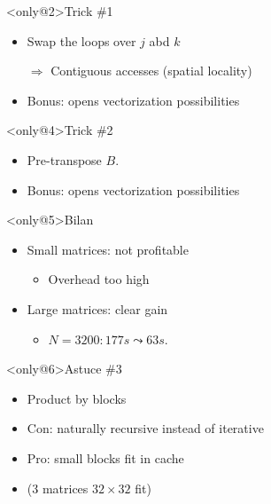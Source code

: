 \documentclass[xcolor={x11names,svgnames}]{beamer}
\begin{document}
\begin{frame}[label=applications,fragile]
\begin{overlayarea}{\textwidth}{4cm}
\begin{block}<only@2>{Trick \#1}
\begin{itemize}
\item Swap the loops over $j$ abd $k$
\item[$\Rightarrow$] Contiguous accesses (spatial locality)
\item Bonus: opens vectorization possibilities
\end{itemize}
\end{block}


\begin{block}<only@4>{Trick \#2}
\begin{itemize}
\item Pre-transpose $B$.
  
\item Bonus: opens vectorization possibilities
\end{itemize}
\end{block}

\begin{exampleblock}<only@5>{Bilan}
  \begin{itemize}    
  \item Small matrices: not profitable
    \begin{itemize}
    \item Overhead too high
    \end{itemize}

  \item Large matrices: clear gain
    \begin{itemize}
    \item $N=3200 : 177s \leadsto 63s$.
    \end{itemize}
  \end{itemize}
\end{exampleblock}

\begin{block}<only@6>{Astuce \#3}
  \begin{itemize}
  \item Product by blocks
  
  \item Con: naturally recursive instead of iterative

  \item Pro: small blocks fit in cache
  \item (3 matrices $32 \times 32$ fit)
  \end{itemize}
\end{block}
\end{overlayarea}
\end{frame}
\end{document}
